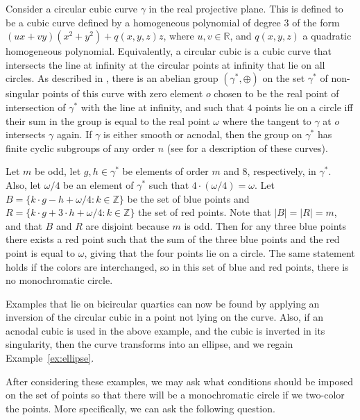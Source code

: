 \documentclass[a4paper,11pt,leqno]{article}
\begin{document}
\begin{example}
Consider a circular cubic curve $\gamma$ in the real projective plane.
This is defined to be a cubic curve defined by a homogeneous polynomial of degree $3$ of the form $(ux + vy)(x^2 + y^2) + q(x, y, z)z$, where $u, v\in\mathbb{R}$, and $q(x,y,z)$ a quadratic homogeneous polynomial.
Equivalently, a circular cubic is a cubic curve that intersects the line at infinity at the circular points at infinity that lie on all circles.
As described in \cite{LMMSSZ}, there is an abelian group $(\gamma^*,\oplus)$ on the set $\gamma^*$ of non-singular points of this curve with zero element $o$ chosen to be the real point of intersection of $\gamma^*$ with the line at infinity, and such that $4$ points lie on a circle iff their sum in the group is equal to the real point $\omega$ where the tangent to $\gamma$ at $o$ intersects $\gamma$ again.
If $\gamma$ is either smooth or acnodal, then the group on $\gamma^*$ has
finite cyclic subgroups of any order $n$  (see \cite{LMMSSZ} for a description of these curves).

Let $m$ be odd, let $g,h\in\gamma^*$ be elements of order $m$ and $8$, respectively, in $\gamma^*$.
Also, let $\omega/4$ be an element of $\gamma^*$ such that $4\cdot(\omega/4)=\omega$.
Let $B=\{k\cdot g - h + \omega/4 : k\in\mathbb{Z}\}$ be the set of blue points and $R=\{k\cdot g + 3\cdot h +\omega/4 : k\in\mathbb{Z}\}$ the set of red points.
Note that $|B|=|R|=m$, and that $B$ and $R$ are disjoint because $m$ is odd.
Then for any three blue points there exists a red point such that the sum of the three blue points and the red point is equal to $\omega$, giving that the four points lie on a circle.
The same statement holds if the colors are interchanged, so in this set of blue and red points, there is no monochromatic circle.

Examples that lie on bicircular quartics can now be found by applying an inversion of the circular cubic in a point not lying on the curve.
Also, if an acnodal cubic is used in the above example, and the cubic is inverted in its singularity, then the curve transforms into an ellipse, and we regain Example~\ref{ex:ellipse}.
\end{example}
After considering these examples, we may ask what conditions should be imposed on the set of points so that there will be a monochromatic circle if we two-color the points.
More specifically, we can ask the following question.
\end{document}
